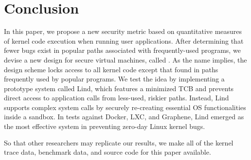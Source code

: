 \section{Conclusion}
\label{sec.conclusion}

In this paper, we propose a new security metric based on quantitative measures of kernel code execution when running user applications.
After determining that fewer bugs exist in popular paths associated with frequently-used
programs, we devise a new design for secure virtual machines, called \lip.
As the name implies, the design scheme locks access to all
kernel code except that found in paths frequently used by
popular programs. We test the \lip idea by implementing a prototype system
called Lind, which features a minimized TCB and prevents direct access to application
calls from less-used, riskier paths.
Instead, Lind supports complex system calls by securely re-creating
essential OS functionalities inside a sandbox.
In tests against Docker, LXC, and Graphene, Lind emerged as the most effective system in preventing
zero-day Linux kernel bugs.

So that other researchers may replicate our results, we make all of the kernel
trace data, benchmark data, and source code for this paper available. 
